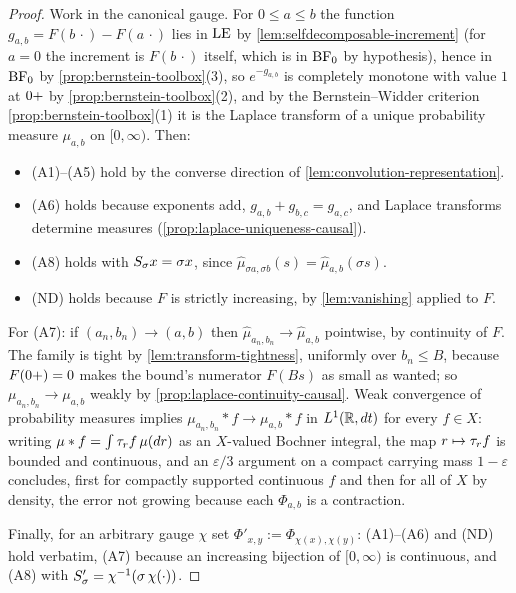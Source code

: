 \begin{proof}
\leanok
Work in the canonical gauge. For $0 \le a \le b$ the function $g_{a,b} = F(b\,\cdot) - F(a\,\cdot)$
lies in $\mathrm{LE}$ by \ref{lem:selfdecomposable-increment} (for $a = 0$ the increment is
$F(b\,\cdot)$ itself, which is in $\mathrm{BF}_0$ by hypothesis), hence in $\mathrm{BF}_0$ by
\ref{prop:bernstein-toolbox}(3), so $e^{-g_{a,b}}$ is completely monotone
with value $1$ at $0{+}$ by \ref{prop:bernstein-toolbox}(2), and by the Bernstein--Widder
criterion \ref{prop:bernstein-toolbox}(1) it is the Laplace transform of a unique probability
measure $\mu_{a,b}$ on $[0,\infty)$. Then:
\begin{itemize}
\item (A1)--(A5) hold by the converse direction of \ref{lem:convolution-representation}.
\item (A6) holds because exponents add, $g_{a,b} + g_{b,c} = g_{a,c}$, and Laplace transforms
determine measures (\ref{prop:laplace-uniqueness-causal}).
\item (A8) holds with $S_\sigma x = \sigma x$, since
$\hat\mu_{\sigma a, \sigma b}(s) = \hat\mu_{a,b}(\sigma s)$.
\item (ND) holds because $F$ is strictly increasing, by \ref{lem:vanishing} applied to $F$.
\end{itemize}

For (A7): if $(a_n, b_n) \to (a,b)$ then $\hat\mu_{a_n,b_n} \to \hat\mu_{a,b}$ pointwise, by
continuity of $F$. The family is tight by \ref{lem:transform-tightness}, uniformly over
$b_n \le B$, because $F(0{+}) = 0$ makes the bound's numerator $F(Bs)$ as small as wanted; so
$\mu_{a_n,b_n} \to \mu_{a,b}$ weakly by \ref{prop:laplace-continuity-causal}. Weak convergence
of probability measures implies $\mu_{a_n,b_n} * f \to \mu_{a,b} * f$ in $L^1(\mathbb{R}, dt)$ for every
$f \in X$: writing $\mu * f = \int \tau_r f\, \mu(dr)$ as an $X$-valued Bochner integral, the
map $r \mapsto \tau_r f$ is bounded and continuous, and an $\varepsilon/3$ argument on a
compact carrying mass $1 - \varepsilon$ concludes, first for compactly supported continuous $f$
and then for all of $X$ by density, the error not growing because each $\Phi_{a,b}$ is a
contraction.

Finally, for an arbitrary gauge $\chi$ set $\Phi'_{x,y} := \Phi_{\chi(x),\chi(y)}$: (A1)--(A6)
and (ND) hold verbatim, (A7) because an increasing bijection of $[0,\infty)$ is continuous, and
(A8) with $S'_\sigma = \chi^{-1}(\sigma\,\chi(\cdot))$.
\end{proof}

